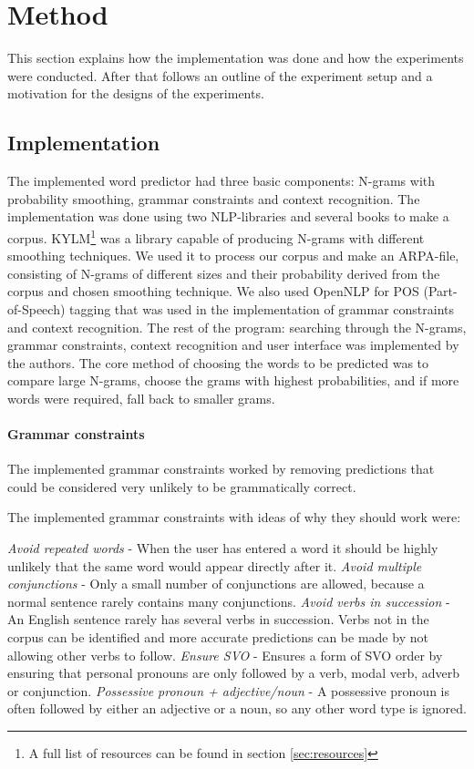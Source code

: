 \section{Method}
This section explains how the implementation was done and how the experiments were conducted. After that follows an outline of the experiment setup and a motivation for the designs of the experiments.
\subsection{Implementation}
The implemented word predictor had three basic components: N-grams with probability smoothing, grammar constraints and context recognition. The implementation was done using two NLP-libraries and several books to make a corpus. KYLM\footnote{A full list of resources can be found in section \ref{sec:resources}} was a library capable of producing N-grams with different smoothing techniques. We used it to process our corpus and make an ARPA-file, consisting of N-grams of different sizes and their probability derived from the corpus and chosen smoothing technique. We also used OpenNLP for POS (Part-of-Speech) tagging that was used in the implementation of grammar constraints and context recognition. The rest of the program: searching through the N-grams, grammar constraints, context recognition and user interface was implemented by the authors. The core method of choosing the words to be predicted was to compare large N-grams, choose the grams with highest probabilities, and if more words were required, fall back to smaller grams.

\paragraph{Grammar constraints}
The implemented grammar constraints worked by removing predictions that could be considered very unlikely to be grammatically correct.

The implemented grammar constraints with ideas of why they should work were:

\emph{Avoid repeated words} - When the user has entered a word it should be highly unlikely that the same word would appear directly after it.
\emph{Avoid multiple conjunctions} - Only a small number of conjunctions are allowed, because a normal sentence rarely contains many conjunctions.
\emph{Avoid verbs in succession} - An English sentence rarely has several verbs in succession. Verbs not in the corpus can be identified and more accurate predictions can be made by not allowing other verbs to follow.
\emph{Ensure SVO} - Ensures a form of SVO order by ensuring that personal pronouns are only followed by a verb, modal verb, adverb or conjunction.
\emph{Possessive pronoun + adjective/noun} - A possessive pronoun is often followed by either an adjective or a noun, so any other word type is ignored.


